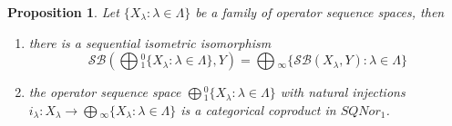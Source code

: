 \documentclass[12pt]{article}
\newtheorem{proposition}[theorem]{Proposition}
\begin{document}
\begin{proposition}\label{PrSQCoProdUnivProp} Let 
$ \{X_\lambda:\lambda\in \Lambda \}$ be a family of operator sequence spaces, 
then
\begin{enumerate}[label = (\roman*)]
    \item there is a sequential isometric isomorphism
    $$
    \mathcal{SB}\left(\bigoplus{}_1^0 \{X_\lambda:\lambda\in\Lambda \},Y\right)
    =\bigoplus{}_\infty \{\mathcal{SB}(X_\lambda,Y):\lambda\in\Lambda \}
    $$

    \item the operator sequence space 
    $\bigoplus{}_1^0 \{X_\lambda:\lambda\in\Lambda \}$ 
    with natural injections 
    $i_\lambda:X_\lambda\to\bigoplus{}_\infty \{X_\lambda:\lambda\in\Lambda \}$ 
    is a categorical coproduct in $SQNor_1$.
\end{enumerate}
\end{proposition}
\end{document}
